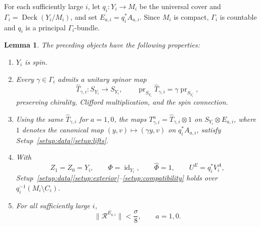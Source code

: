 \documentclass[12pt,reqno]{amsart}
\numberwithin{equation}{section}
\newtheorem{lemma}[theorem]{Lemma}
\theoremstyle{definition}
\newcommand{\Deck}{\operatorname{Deck}}
\newcommand{\cR}{\mathcal R}
\begin{document}
For each sufficiently large $i$, let $q_i:Y_i\to M_i$ be the
universal cover and $\Gamma_i=\Deck(Y_i/M_i)$, and set
$E_{a,i}=q_i^*A_{a,i}$.  Since $M_i$ is compact, $\Gamma_i$ is
countable and $q_i$ is a principal $\Gamma_i$-bundle.

\begin{lemma}\label{lem:K-lifted}
The preceding objects have the following properties:
\begin{enumerate}[label=\textup{(K\arabic*)},ref=\textup{(K\arabic*)},
                  start=5,leftmargin=3.4em]
\item\label{K:spin}
$Y_i$ is spin.

\item
Every $\gamma\in\Gamma_i$ admits a unitary spinor map
\[
 \widehat T_{\gamma,i}:S_{Y_i}\longrightarrow S_{Y_i},
 \qquad
 \operatorname{pr}_{S_{Y_i}}\widehat T_{\gamma,i}
 =\gamma\operatorname{pr}_{S_{Y_i}},
\]
preserving chirality, Clifford multiplication, and the spin connection.

\item\label{K:T-maps}
Using the same $\widehat T_{\gamma,i}$ for $a=1,0$, the maps
$T^a_{\gamma,i}=\widehat T_{\gamma,i}\otimes1$
on $S_{Y_i}\otimes E_{a,i}$, where $1$ denotes the canonical map
$(y,v)\mapsto(\gamma y,v)$ on $q_i^*A_{a,i}$, satisfy
Setup~\ref{setup:data}\ref{setup:lifts}.

\item\label{K:exterior-maps}
With
\[
 Z_1=Z_0=Y_i,\qquad
 \Phi=\operatorname{id}_{Y_i},\qquad
 \widehat\Phi=1,\qquad
 U^E=q_i^*V_i^A,
\]
Setup~\ref{setup:data}\ref{setup:exterior}--\ref{setup:compatibility}
holds over $q_i^{-1}(M_i\setminus C_i)$.

\item\label{K:small-contraction}
For all sufficiently large $i$,
\[
 \|\cR^{E_{a,i}}\|<\frac{\sigma}{8},
 \qquad a=1,0.
\]
\end{enumerate}
\end{lemma}
\end{document}
